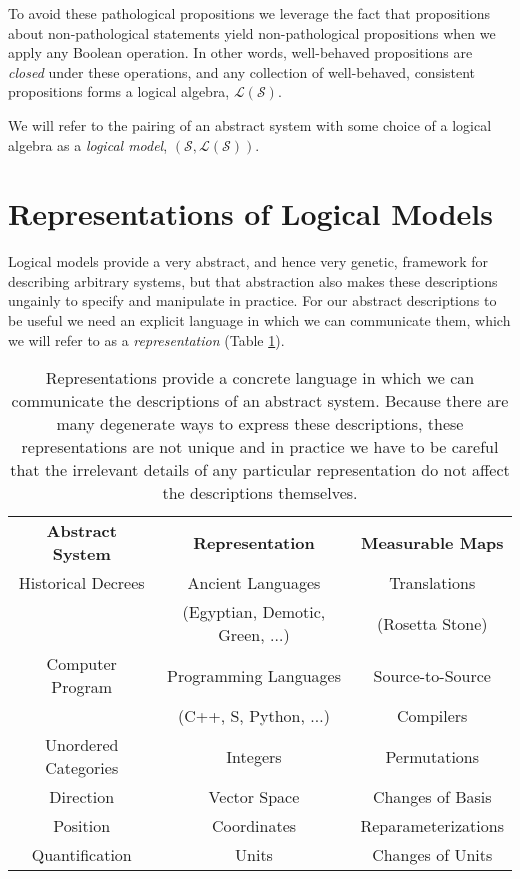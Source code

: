 To avoid these pathological propositions we leverage the fact that propositions
about non-pathological statements yield non-pathological propositions when 
we apply any Boolean operation.  In other words, well-behaved propositions 
are \emph{closed} under these operations, and any collection of well-behaved, 
consistent propositions forms a logical algebra, 
$\mathcal{L} \! \left( \mathcal{S} \right)$.  

We will refer to the pairing of an abstract system with some choice of a logical
algebra as a \emph{logical model}, 
$\left( \mathcal{S}, \mathcal{L} \! \left( \mathcal{S} \right) \right)$.

\section{Representations of Logical Models}

Logical models provide a very abstract, and hence very genetic, framework for 
describing arbitrary systems, but that abstraction also makes these descriptions
ungainly to specify and manipulate in practice.  For our abstract descriptions to 
be useful we need an explicit language in which we can communicate them, 
which we will refer to as a \emph{representation} 
(Table \ref{tab:representation_examples}).

\begin{table}
  \centering
  \renewcommand{\arraystretch}{1.5}
  \begin{tabular}{ccc}
    \rowcolor[gray]{0.9} 
    \textbf{Abstract System} & \textbf{Representation} & \textbf{Measurable Maps} \\
    Historical Decrees & Ancient Languages & Translations \\
    & (Egyptian, Demotic, Green, $\ldots$) & (Rosetta Stone) \\
    Computer Program & Programming Languages & Source-to-Source \\
    & (C++, S, Python, $\ldots$) & Compilers \\
    Unordered Categories & Integers & Permutations \\
    Direction & Vector Space & Changes of Basis \\
    Position & Coordinates & Reparameterizations \\
    Quantification & Units & Changes of Units \\
  \end{tabular}
\caption{Representations provide a concrete language in which we can
communicate the descriptions of an abstract system.  Because there 
are many degenerate ways to express these descriptions, these 
representations are not unique and in practice we have to be careful 
that the irrelevant details of any particular representation do not affect
the descriptions themselves.}
\label{tab:representation_examples}
\end{table}

